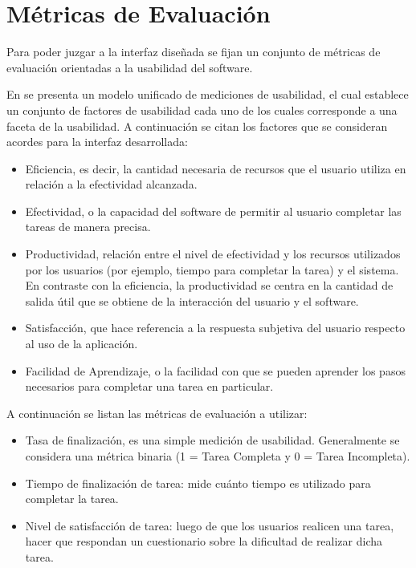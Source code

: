 \section{M\'etricas de Evaluaci\'on}
\label{sec:metricas}

Para poder juzgar a la interfaz dise\~nada se fijan un conjunto de m\'etricas
de evaluaci\'on orientadas a la usabilidad del software.

En \cite{AhmedUsability2006} se presenta un modelo unificado de mediciones de usabilidad, el cual
establece un conjunto de factores de usabilidad cada uno de los cuales corresponde a una
faceta de la usabilidad. A continuaci\'on se citan los factores que se
consideran acordes para la interfaz desarrollada:

\begin{itemize}
    \item Eficiencia, es decir, la cantidad necesaria de recursos que el usuario utiliza
	en relaci\'on a la efectividad alcanzada.
    \item Efectividad, o la capacidad del software de permitir al usuario completar las tareas
	de manera precisa.
    \item Productividad, relaci\'on entre el nivel de efectividad y los recursos utilizados por los
	usuarios (por ejemplo, tiempo para completar la tarea) y el sistema. En contraste con la eficiencia,
	la productividad se centra en la cantidad de salida \'util que se obtiene de la interacci\'on del
	usuario y el software.
    \item Satisfacci\'on, que hace referencia a la respuesta subjetiva del usuario respecto al uso de la
	aplicaci\'on.
    \item Facilidad de Aprendizaje, o la facilidad con que se pueden aprender los pasos necesarios
	para completar una tarea en particular.
\end{itemize}

A continuaci\'on se listan las m\'etricas de evaluaci\'on a utilizar:


\begin{itemize}
    \item Tasa de finalizaci\'on, es una simple medici\'on de usabilidad. Generalmente se
	considera una m\'etrica binaria (1 = Tarea Completa y 0 = Tarea Incompleta).
    \item Tiempo de finalizaci\'on de tarea: mide cu\'anto tiempo es utilizado para
	completar la tarea.
    \item Nivel de satisfacci\'on de tarea: luego de que los usuarios realicen una tarea, hacer
	que respondan un cuestionario sobre la dificultad de realizar dicha tarea.
\end{itemize}
